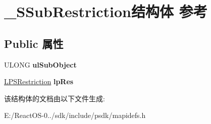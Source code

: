 \hypertarget{struct___s_sub_restriction}{}\section{\+\_\+\+S\+Sub\+Restriction结构体 参考}
\label{struct___s_sub_restriction}
\subsection*{Public 属性}
\begin{DoxyCompactItemize}
\item 
\mbox{\label{struct___s_sub_restriction_a93e5c420954d294bbf923251870b0ba1}} 
U\+L\+O\+NG {\bfseries ul\+Sub\+Object}
\item 
\mbox{\label{struct___s_sub_restriction_a1e44180222b1789fed6d3d652319852e}} 
\hyperlink{struct___s_restriction}{L\+P\+S\+Restriction} {\bfseries lp\+Res}
\end{DoxyCompactItemize}


该结构体的文档由以下文件生成\+:\begin{DoxyCompactItemize}
\item 
E\+:/\+React\+O\+S-\/0../sdk/include/psdk/mapidefs.\+h\end{DoxyCompactItemize}
